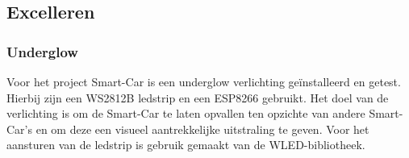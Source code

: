 \subsection{Excelleren}
\subsubsection{Underglow}
Voor het project \gls{Smart-Car} is een underglow verlichting geïnstalleerd en getest. Hierbij zijn een \gls{WS2812B}\cite{WS2812B} ledstrip en een \gls{ESP8266}\cite{ESP8266} gebruikt. Het doel van de verlichting is om de \gls{Smart-Car} te laten opvallen ten opzichte van andere \gls{Smart-Car}'s en om deze een visueel aantrekkelijke uitstraling te geven. Voor het aansturen van de ledstrip is gebruik gemaakt van de \gls{WLED}-bibliotheek.
